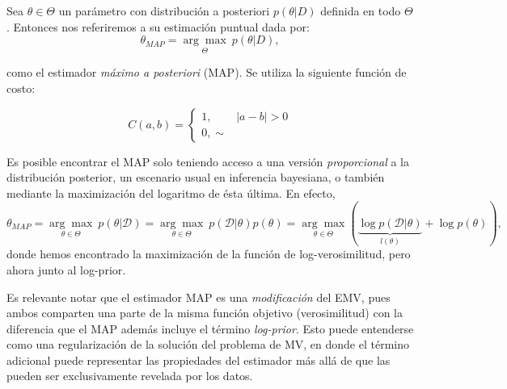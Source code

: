 \begin{definition}
Sea $\theta \in \Theta$ un parámetro con distribución a posteriori $p(\theta |D)$ definida en todo $\Theta$. Entonces nos referiremos a su estimación puntual dada por: 
$$
\theta_{MAP}= \underset{\Theta}{\arg\max}\ p(\theta|D),
$$

como el estimador \emph{máximo a posteriori} (MAP). Se utiliza la siguiente función de costo:

\[C(a,b)=\begin{cases}
  1, &|a-b|>0\\
  0, \sim
\end{cases}\]
\end{definition}

\begin{remark}
Es posible encontrar el MAP solo teniendo acceso a una versión \emph{proporcional} a la distribución posterior, un escenario usual en inferencia bayesiana, o también mediante la maximización del logaritmo de ésta última. En efecto, 
$$
\theta_{MAP} = \underset{\theta \in \Theta}{\arg\max }\ p(\theta|\mathcal{D}) = \underset{\theta \in \Theta}{\arg\max }\ p(\mathcal{D}|\theta)p(\theta)= \underset{\theta \in \Theta}{\arg\max}\left(\underbrace{\log p(\mathcal{D}|\theta)}_{l(\theta)} + \log p(\theta)\right),
$$
donde hemos encontrado la maximización de  la función de log-verosimilitud, pero ahora junto al log-prior.
\end{remark}

\begin{remark}
Es relevante notar que el estimador MAP es una \emph{modificación} del EMV, pues ambos comparten una parte de la misma función objetivo (verosimilitud) con la diferencia que el MAP además incluye el término \emph{log-prior}. Esto puede entenderse como una regularización de la solución del problema de MV, en donde el término adicional puede representar las propiedades del estimador más allá de que las pueden ser exclusivamente revelada por los datos. 
\end{remark}

